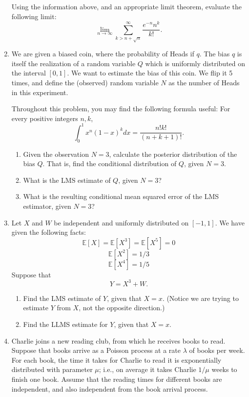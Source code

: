 \documentclass[a4paper,9pt,landscape]{extarticle}
\begin{document}
\begin{multicols*}{3}
\begin{enumerate}
	Using the information above, and an appropriate limit theorem, evaluate the following limit: $$\lim\limits_{n\rightarrow\infty}\sum_{k>n+\sqrt{n}}^{\infty}\dfrac{e^{-n}n^k}{k!}.$$
	\item We are given a biased coin, where the probability of Heads if $q$. The bias $q$ is itself the realization of a random variable $Q$ which is uniformly distributed on the interval $[0,1]$. We want to estimate the bias of this coin. We flip it 5 times, and define the (observed) random variable $N$ as the number of Heads in this experiment.
	
	Throughout this problem, you may find the following formula useful: For every positive integers $n,k$,
	$$\int_{0}^{1}x^n(1-x)^kdx=\dfrac{n!k!}{(n+k+1)!}.$$
	\begin{enumerate}
		\item Given the observation $N=3$, calculate the posterior distribution of the bias $Q$. That is, find the conditional distribution of $Q$, given $N=3$.
		\item What is the LMS estimate of $Q$, given $N=3$?
		\item What is the resulting conditional mean squared error of the LMS estimator, given $N=3$?
	\end{enumerate}
	\item Let $X$ and $W$ be independent and uniformly distributed on $[-1,1]$. We have given the following facts:
	$$\mathds{E}[X]=\mathds{E}[X^3]=\mathds{E}[X^5]=0$$
	$$\mathds{E}[X^2]=1/3$$
	$$\mathds{E}[X^4]=1/5$$
	Suppose that $$Y=X^3+W.$$
	\begin{enumerate}
		\item Find the LMS estimate of $Y$, given that $X=x$. (Notice we are trying to estimate $Y$ from $X$, not the opposite direction.)
		\item Find the LLMS estimate for $Y$, given that $X=x$.
	\end{enumerate}
	\item Charlie joins a new reading club, from which he receives books to read. Suppose that books arrive as a Poisson process at a rate $\lambda$ of books per week. For each book, the time it takes for Charlie to read it is exponentially distributed with parameter $\mu$; i.e., on average it takes Charlie $1/\mu$ weeks to finish one book. Assume that the reading times for different books are independent, and also independent from the book arrival process.
	

\end{enumerate}
\end{multicols*}
\end{document}

